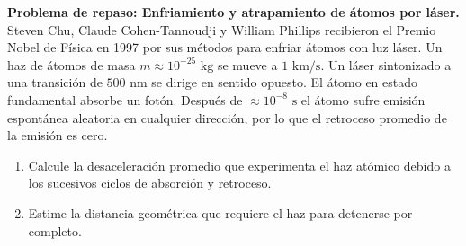 \item \textbf{Problema de repaso: Enfriamiento y atrapamiento de átomos por láser.}
Steven Chu, Claude Cohen-Tannoudji y William Phillips recibieron el Premio Nobel de Física en 1997 por sus métodos para enfriar átomos con luz láser. Un haz de átomos de masa $m \approx 10^{-25}\text{ kg}$ se mueve a $1\text{ km/s}$. Un láser sintonizado a una transición de $500\text{ nm}$ se dirige en sentido opuesto. El átomo en estado fundamental absorbe un fotón. Después de $\approx 10^{-8}\text{ s}$ el átomo sufre emisión espontánea aleatoria en cualquier dirección, por lo que el retroceso promedio de la emisión es cero.
\begin{enumerate}
    \item Calcule la desaceleración promedio que experimenta el haz atómico debido a los sucesivos ciclos de absorción y retroceso.
    \item Estime la distancia geométrica que requiere el haz para detenerse por completo.
\end{enumerate}